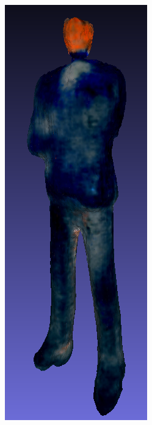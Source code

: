 \begin{figure}[H]
    \centering
    \small
    \begin{subfigure}[b]{0.116\textwidth}
        \centering
        \includegraphics[width=\textwidth]{figures/future/bias_ceo_dreamfusion.png}

\end{subfigure}
\end{figure}
